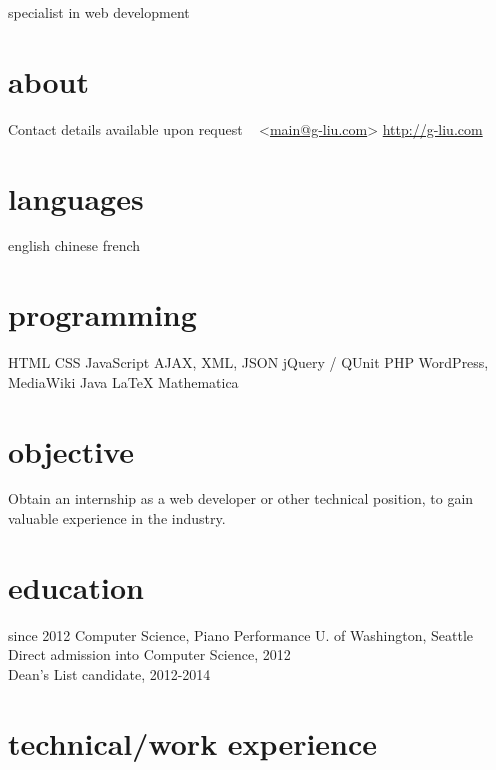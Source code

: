 \documentclass[]{friggeri-cv}
\begin{document}
       {specialist in web development}

\begin{aside}
  \section{about}
    Contact details available upon request
    ~
    <\href{mailto:main@g-liu.com}{main@g-liu.com}>
    \href{http://g-liu.com}{http://g-liu.com}
  \section{languages}
    english
    chinese
    french
  \section{programming}
    HTML
    CSS
    JavaScript
    AJAX, XML, JSON
    jQuery / QUnit
    PHP
    WordPress, MediaWiki
    Java
    LaTeX
    Mathematica
\end{aside}

\section{objective}

Obtain an internship as a web developer or other technical position, to gain valuable experience in the industry.

\section{education}

\begin{entrylist}
  \entry
    {since 2012}
    {Computer Science, Piano Performance}
    {U. of Washington, Seattle}
    {Direct admission into Computer Science, 2012 \\
    Dean's List candidate, 2012-2014}
\end{entrylist}

\section{technical/work experience}
\end{document}
